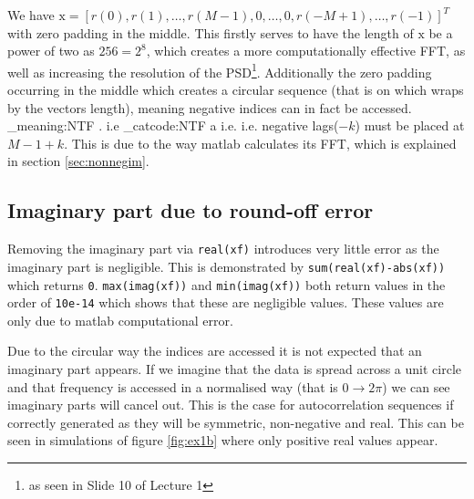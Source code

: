 \documentclass[10pt,twoside,a4paper]{report}
\makeatletter
\newcommand\latinabbrev[1]{
  \peek_meaning:NTF . {%
    #1\@}%
  { \peek_catcode:NTF a {%
      #1.\@ }%
    {#1.\@}}}
\makeatother
\begin{document}
We have $\boldsymbol{\mathrm{x}} = [r(0), r(1), \dots ,r(M - 1),0, \dots, 0, r(-M + 1), \dots, r(-1)]^{T}$ with zero padding in the middle.  This firstly serves to have the length of $\boldsymbol{\mathrm{x}}$ be a power of two as $256 = 2^8$, which creates a more computationally effective FFT, as well as increasing the resolution of the PSD\footnote{as seen in Slide 10 of Lecture 1}. Additionally the zero padding occurring in the middle which creates a circular sequence (that is on which wraps by the vectors length), meaning negative indices can in fact be accessed. \latinabbrev{i.e} negative lags($-k$) must be placed at $M-1+k$. This is due to the way matlab calculates its FFT, which is explained in section \ref{sec:nonnegim}.


\subsection{Imaginary part due to round-off error}
Removing the imaginary part via \texttt{real(xf)} introduces very little error as the imaginary part is negligible. This is demonstrated by \texttt{sum(real(xf)-abs(xf))} which returns \texttt{0}. \texttt{max(imag(xf))} and \texttt{min(imag(xf))} both return values in the order of \texttt{10e-14} which shows that these are negligible values. These values are only due to matlab computational error.

Due to the circular way the indices are accessed it is not expected that an imaginary part appears. If we imagine that the data is spread across a unit circle and that frequency is accessed in a normalised way  (that is $0 \to 2\pi$) we can see imaginary parts will cancel out. This is the case for autocorrelation sequences if correctly generated as they will be symmetric, non-negative and real. This can be seen in simulations of figure \ref{fig:ex1b} where only positive real values appear.
\end{document}
